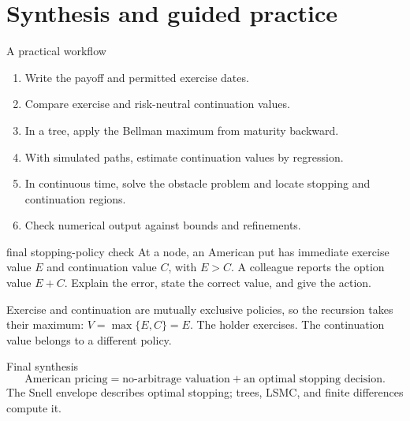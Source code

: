 \documentclass[10pt]{article}
\newcommand{\1}{\mathbf 1}
\theoremstyle{definition}
\begin{document}
\section{Synthesis and guided practice}

\begin{keyidea}{A practical workflow}
\begin{enumerate}
  \item Write the payoff and permitted exercise dates.
  \item Compare exercise and risk-neutral continuation values.
  \item In a tree, apply the Bellman maximum from maturity backward.
  \item With simulated paths, estimate continuation values by regression.
  \item In continuous time, solve the obstacle problem and locate stopping
        and continuation regions.
  \item Check numerical output against bounds and refinements.
\end{enumerate}
\end{keyidea}

\begin{studentexercise}{final stopping-policy check}
At a node, an American put has immediate exercise value \(E\) and
continuation value \(C\), with \(E>C\). A colleague reports the option value
\(E+C\). Explain the error, state the correct value, and give the action.
\end{studentexercise}
\begin{shortsolution}
Exercise and continuation are mutually exclusive policies, so the recursion
takes their maximum: \(V=\max\{E,C\}=E\). The holder exercises. The
continuation value belongs to a different policy.
\end{shortsolution}

\begin{keyidea}{Final synthesis}
\[
\boxed{\text{American pricing}
=\text{no-arbitrage valuation}+\text{an optimal stopping decision}.}
\]
The Snell envelope describes optimal stopping; trees, LSMC, and finite differences compute it.
\end{keyidea}
\end{document}
